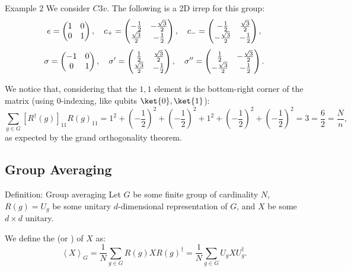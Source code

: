 \documentclass[a4paper]{article}
\begin{document}
\begin{parag}{Example 2}
    We consider $C3v$. The following is a 2D irrep for this group: 
    \[e = \begin{pmatrix} 1 & 0 \\ 0 & 1 \end{pmatrix}, \quad c_+ = \begin{pmatrix} -\frac{1}{2} & -\frac{\sqrt{3}}{2} \\ \frac{\sqrt{3}}{2} & -\frac{1}{2} \end{pmatrix}, \quad c_- = \begin{pmatrix} -\frac{1}{2} & \frac{\sqrt{3}}{2} \\ -\frac{\sqrt{3}}{2} & -\frac{1}{2} \end{pmatrix},\]
    \[\sigma = \begin{pmatrix} -1 & 0 \\ 0 & 1 \end{pmatrix}, \quad \sigma' = \begin{pmatrix} \frac{1}{2} & \frac{\sqrt{3}}{2} \\ \frac{\sqrt{3}}{2} & -\frac{1}{2} \end{pmatrix}, \quad \sigma'' = \begin{pmatrix} \frac{1}{2} & -\frac{\sqrt{3}}{2} \\ -\frac{\sqrt{3}}{2} & -\frac{1}{2} \end{pmatrix}.\]
    
    We notice that, considering that the $1, 1$ element is the bottom-right corner of the matrix (using 0-indexing, like qubits $\ket{0}, \ket{1}$):
    \[\sum_{g \in G} \left[R^{\dagger}\left(g\right)\right]_{11} R\left(g\right)_{11} = 1^2 + \left(-\frac{1}{2}\right)^2 + \left(-\frac{1}{2}\right)^2 + 1^2 + \left(-\frac{1}{2}\right)^2 + \left(-\frac{1}{2}\right)^2 = 3 = \frac{6}{2} = \frac{N}{n},\]
    as expected by the grand orthogonality theorem.
\end{parag}

\subsection{Group Averaging}

\begin{parag}{Definition: Group averaging}
    Let $G$ be some finite group of cardinality $N$, $R\left(g\right) = U_g$ be some unitary $d$-dimensional representation of $G$, and $X$ be some $d \times d$ unitary.

    We define the  (or ) of $X$ as: 
    \[\left\langle X \right\rangle_G = \frac{1}{N} \sum_{g \in G} R\left(g\right) X R\left(g\right)^{\dagger} = \frac{1}{N} \sum_{g \in G} U_g X U_g^{\dagger}.\]
\end{parag}
\end{document}
